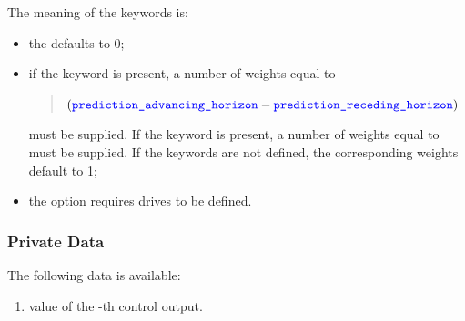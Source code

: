 The meaning of the keywords is:
\begin{itemize}
\item the  defaults to 0;

\item if the keyword  is present,
a number of weights  equal to
\begin{quote}
$(\textcolor{blue}{\texttt{prediction\_advancing\_horizon}} - \textcolor{blue}{\texttt{prediction\_receding\_horizon}})$
\end{quote}
must be supplied.
If the keyword  is present,
a number of weights  equal to 
must be supplied.
If the keywords are not defined, the corresponding weights
default to 1;

\item the 
option requires  drives to be defined.
\end{itemize}

\subsubsection{Private Data}
The following data is available:
\begin{enumerate}
\item {} value of the -th control output.
\end{enumerate}

